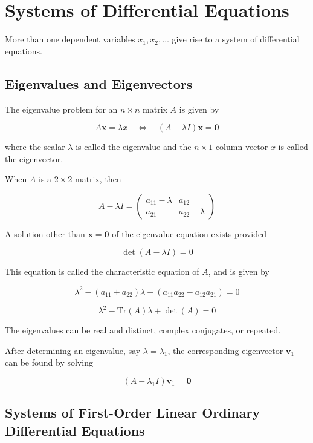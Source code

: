 \section{Systems of Differential Equations}

More than one dependent variables $x_1, x_2, \dots$ give rise to a system of differential equations.

\subsection{Eigenvalues and Eigenvectors}

The eigenvalue problem for an $n \times n$ matrix $A$ is given by

$$A \mathbf{x} = \lambda x \quad \iff \quad (A - \lambda I) \mathbf{x} = \mathbf{0}$$

where the scalar $\lambda$ is called the eigenvalue and the $n \times 1$ column vector $x$ is called the eigenvector.

When $A$ is a $2 \times 2$ matrix, then

$$A - \lambda I = \begin{pmatrix}
    a_{11} - \lambda & a_{12} \\
    a_{21} & a_{22} - \lambda
\end{pmatrix}$$

A solution other than $\mathbf{x} = \mathbf{0}$ of the eigenvalue equation exists provided

$$\det(A - \lambda I) = 0$$

This equation is called the characteristic equation of $A$, and is given by

$$\lambda^2 - (a_{11} + a_{22}) \lambda + (a_{11} a_{22} - a_{12} a_{21}) = 0$$

$$\lambda^2 - \text{Tr}(A) \lambda + \det(A) = 0$$

The eigenvalues can be real and distinct, complex conjugates, or repeated.

After determining an eigenvalue, say $\lambda = \lambda_1$, the corresponding eigenvector $\mathbf{v}_1$ can be found by solving

$$(A - \lambda_1 I) \mathbf{v}_1 = \mathbf{0}$$

\subsection{Systems of First-Order Linear Ordinary Differential Equations}

